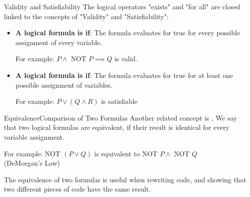 
\begin{frame}{Validity and Satisfiability}
  The logical operators "exists" and "for all" are closed linked to the concepts of "Validity" and "Satisfiability":\bigskip

  \begin{itemize}
    \item {\bf A logical formula is  if}: The formula evaluates for true for every possible assignment of every variable.\medskip

    For example: $P \land \text{ NOT } P \implies Q$ is valid.\bigskip

    \item {\bf A logical formula is  if}: The formula evaluates for true for at least one possible assignment of variables.\medskip

    For example: $P \lor (Q \land R)$ is satisfiable
  \end{itemize}\bigskip
\end{frame}





\begin{frame}{Equivalence}{Comparison of Two Formulas}
  Another related concept is . We say that two logical formulas are equivalent, if their result is identical for every variable assignment.\vfill

  For example: $\text{NOT }(P \lor Q)$ is equivalent to $\text{NOT } P \land \text{ NOT } Q$\\
  \hfill (DeMorgan's Law)\vfill

  The equivalence of two formulas is useful when rewriting code, and showing that two different pieces of code have the same result.
\end{frame}

